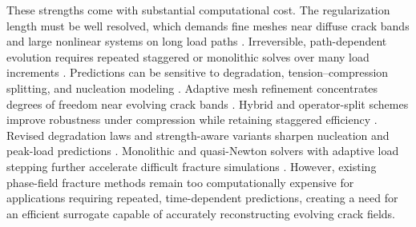 \documentclass[10pt]{article}
\theoremstyle{definition}
\begin{document}
These strengths come with substantial computational cost.
%
The regularization length must be well resolved, which demands fine meshes near diffuse crack bands and large nonlinear systems on long load paths \cite{ambati2015,bourdin2007}.
%
Irreversible, path-dependent evolution requires repeated staggered or monolithic solves over many load increments \cite{miehe2010a,gerasimov2019}.
%
Predictions can be sensitive to degradation, tension--compression splitting, and nucleation modeling \cite{tanne2018,sargado2017,kumar2020}.
%
Adaptive mesh refinement concentrates degrees of freedom near evolving crack bands \cite{heister2015,Hirshikesh2019}.
%
Hybrid and operator-split schemes improve robustness under compression while retaining staggered efficiency \cite{ambati2015,miehe2010a}.
%
Revised degradation laws and strength-aware variants sharpen nucleation and peak-load predictions \cite{sargado2017,tanne2018,kumar2020}.
%
Monolithic and quasi-Newton solvers with adaptive load stepping further accelerate difficult fracture simulations \cite{farrell2017,kristensen2020}.
%
However, existing phase-field fracture methods remain too computationally expensive for applications requiring repeated, time-dependent predictions, creating a need for an efficient surrogate capable of accurately reconstructing evolving crack fields.
\end{document}

